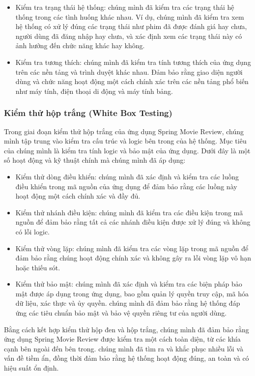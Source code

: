 \documentclass[12pt]{article}
\begin{document}
\begin{itemize}
    \item Kiểm tra trạng thái hệ thống: chúng mình đã kiểm tra các trạng thái hệ thống trong các tình huống khác nhau. Ví dụ, chúng mình đã kiểm tra xem hệ thống có xử lý đúng các trạng thái như phim đã được đánh giá hay chưa, người dùng đã đăng nhập hay chưa, và xác định xem các trạng thái này có ảnh hưởng đến chức năng khác hay không.

    \item Kiểm tra tương thích: chúng mình đã kiểm tra tính tương thích của ứng dụng trên các nền tảng và trình duyệt khác nhau. Đảm bảo rằng giao diện người dùng và chức năng hoạt động một cách chính xác trên các nền tảng phổ biến như máy tính, điện thoại di động và máy tính bảng.

    
\end{itemize}
\subsubsection{Kiểm thử hộp trắng (White Box Testing)}
Trong giai đoạn kiểm thử hộp trắng của ứng dụng Spring Movie Review, chúng mình tập trung vào kiểm tra cấu trúc và logic bên trong của hệ thống. Mục tiêu của chúng mình là kiểm tra tính logic và bảo mật của ứng dụng. Dưới đây là một số hoạt động và kỹ thuật chính mà chúng mình đã áp dụng:
\begin{itemize}
    \item Kiểm thử dòng điều khiển: chúng mình đã xác định và kiểm tra các luồng điều khiển trong mã nguồn của ứng dụng để đảm bảo rằng các luồng này hoạt động một cách chính xác và đầy đủ.

    \item Kiểm thử nhánh điều kiện: chúng mình đã kiểm tra các điều kiện trong mã nguồn để đảm bảo rằng tất cả các nhánh điều kiện được xử lý đúng và không có lỗi logic.

    \item Kiểm thử vòng lặp: chúng mình đã kiểm tra các vòng lặp trong mã nguồn để đảm bảo rằng chúng hoạt động chính xác và không gây ra lỗi vòng lặp vô hạn hoặc thiếu sót.

    \item Kiểm thử bảo mật: chúng mình đã xác định và kiểm tra các biện pháp bảo mật được áp dụng trong ứng dụng, bao gồm quản lý quyền truy cập, mã hóa dữ liệu, xác thực và ủy quyền. chúng mình đã đảm bảo rằng hệ thống đáp ứng các tiêu chuẩn bảo mật và bảo vệ quyền riêng tư của người dùng.
\end{itemize}
Bằng cách kết hợp kiểm thử hộp đen và hộp trắng, chúng mình đã đảm bảo rằng ứng dụng Spring Movie Review được kiểm tra một cách toàn diện, từ các khía cạnh bên ngoài đến bên trong. chúng mình đã tìm ra và khắc phục nhiều lỗi và vấn đề tiềm ẩn, đồng thời đảm bảo rằng hệ thống hoạt động đúng, an toàn và có hiệu suất ổn định.
\end{document}
